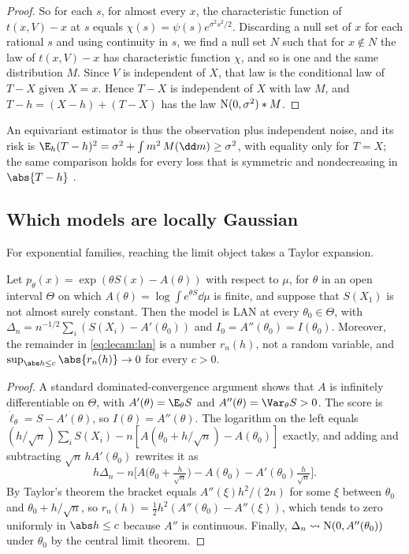 \begin{refsection}
\begin{proof}
So for each $s$, for almost every $x$, the characteristic function of $t(x,V)-x$ at $s$ equals $\chi(s)=\psi(s)e^{\sigma^2s^2/2}$. Discarding a null set of $x$ for each rational $s$ and using continuity in $s$, we find a null set $N$ such that for $x\notin N$ the law of $t(x,V)-x$ has characteristic function $\chi$, and so is one and the same distribution $M$. Since $V$ is independent of $X$, that law is the conditional law of $T-X$ given $X=x$. Hence $T-X$ is independent of $X$ with law $M$, and $T-h=(X-h)+(T-X)$ has the law $\mathrm{N}(0,\sigma^2)*M$.
\end{proof}

An equivariant estimator is thus the observation plus independent noise, and its risk is $\E_h(T-h)^2=\sigma^2+\int m^2\,M(\dd m)\ge\sigma^2$, with equality only for $T=X$; the same comparison holds for every loss that is symmetric and nondecreasing in $\abs{T-h}$ \parencite[Chapter~8]{vanderVaart1998}.

\subsection{Which models are locally Gaussian}

For exponential families, reaching the limit object takes a Taylor expansion.

\begin{theorem}\label{thm:lecam:lan-expfam}
Let $p_\theta(x)=\exp(\theta S(x)-A(\theta))$ with respect to $\mu$, for $\theta$ in an open interval $\Theta$ on which $A(\theta)=\log\int e^{\theta S}\dd\mu$ is finite, and suppose that $S(X_1)$ is not almost surely constant. Then the model is LAN at every $\theta_0\in\Theta$, with $\Delta_n=n^{-1/2}\sum_i(S(X_i)-A'(\theta_0))$ and $I_0=A''(\theta_0)=I(\theta_0)$. Moreover, the remainder in \eqref{eq:lecam:lan} is a number $r_n(h)$, not a random variable, and $\sup_{\abs h\le c}\abs{r_n(h)}\to0$ for every $c>0$.
\end{theorem}

\begin{proof}
A standard dominated-convergence argument shows that $A$ is infinitely differentiable on $\Theta$, with $A'(\theta)=\E_\theta S$ and $A''(\theta)=\Var_\theta S>0$. The score is $\dot\ell_\theta=S-A'(\theta)$, so $I(\theta)=A''(\theta)$. The logarithm on the left equals $(h/\sqrt n)\sum_iS(X_i)-n[A(\theta_0+h/\sqrt n)-A(\theta_0)]$ exactly, and adding and subtracting $\sqrt n\,hA'(\theta_0)$ rewrites it as
\[
  h\Delta_n-n\Big[A\big(\theta_0+\tfrac h{\sqrt n}\big)-A(\theta_0)-A'(\theta_0)\tfrac h{\sqrt n}\Big].
\]
By Taylor's theorem the bracket equals $A''(\xi)h^2/(2n)$ for some $\xi$ between $\theta_0$ and $\theta_0+h/\sqrt n$, so $r_n(h)=\tfrac12h^2(A''(\theta_0)-A''(\xi))$, which tends to zero uniformly in $\abs h\le c$ because $A''$ is continuous. Finally, $\Delta_n\rightsquigarrow\mathrm{N}(0,A''(\theta_0))$ under $\theta_0$ by the central limit theorem.
\end{proof}


\end{refsection}
